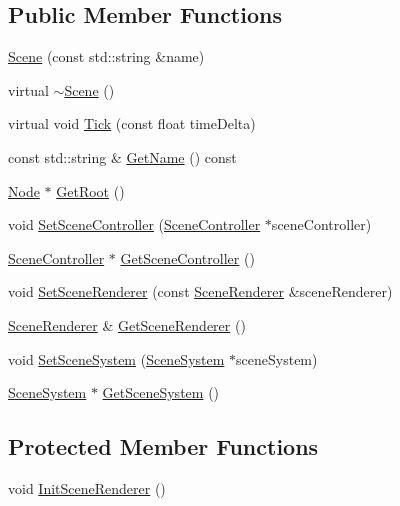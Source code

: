 \subsection*{Public Member Functions}
\begin{DoxyCompactItemize}
\item 
\mbox{\hyperlink{classec_1_1_scene_ad137e70b44b44f22b3e68d50671e9989}{Scene}} (const std\+::string \&name)
\item 
virtual \mbox{\hyperlink{classec_1_1_scene_a25e849d1bd5a9a71af922c3668115cb6}{$\sim$\+Scene}} ()
\item 
virtual void \mbox{\hyperlink{classec_1_1_scene_a07895d944a6045fa0ce5712b6a020c91}{Tick}} (const float time\+Delta)
\item 
const std\+::string \& \mbox{\hyperlink{classec_1_1_scene_a1646cecfcece12eec99d904a4351d21c}{Get\+Name}} () const
\item 
\mbox{\hyperlink{classec_1_1_node}{Node}} $\ast$ \mbox{\hyperlink{classec_1_1_scene_aa2c014fb59f0b51abe5de601a93297d5}{Get\+Root}} ()
\item 
void \mbox{\hyperlink{classec_1_1_scene_a67660c99962c9e12280937dcbbfd2102}{Set\+Scene\+Controller}} (\mbox{\hyperlink{classec_1_1_scene_controller}{Scene\+Controller}} $\ast$scene\+Controller)
\item 
\mbox{\hyperlink{classec_1_1_scene_controller}{Scene\+Controller}} $\ast$ \mbox{\hyperlink{classec_1_1_scene_ac3e1522d93014a5f19193cc3d173d64a}{Get\+Scene\+Controller}} ()
\item 
void \mbox{\hyperlink{classec_1_1_scene_a3f300f8210249e457121aa0696261b4e}{Set\+Scene\+Renderer}} (const \mbox{\hyperlink{classec_1_1_scene_renderer}{Scene\+Renderer}} \&scene\+Renderer)
\item 
\mbox{\hyperlink{classec_1_1_scene_renderer}{Scene\+Renderer}} \& \mbox{\hyperlink{classec_1_1_scene_a79d67056a8b73bf78e37e5d8951363f5}{Get\+Scene\+Renderer}} ()
\item 
void \mbox{\hyperlink{classec_1_1_scene_a24962dd137eba3192c3e88e597c7d03d}{Set\+Scene\+System}} (\mbox{\hyperlink{classec_1_1_scene_system}{Scene\+System}} $\ast$scene\+System)
\item 
\mbox{\hyperlink{classec_1_1_scene_system}{Scene\+System}} $\ast$ \mbox{\hyperlink{classec_1_1_scene_ae9e6923ee710a8b597e1996d1275d4fa}{Get\+Scene\+System}} ()
\end{DoxyCompactItemize}
\subsection*{Protected Member Functions}
\begin{DoxyCompactItemize}
\item 
void \mbox{\hyperlink{classec_1_1_scene_a37c25b9ccec318568e9028be616305c4}{Init\+Scene\+Renderer}} ()
\end{DoxyCompactItemize}
